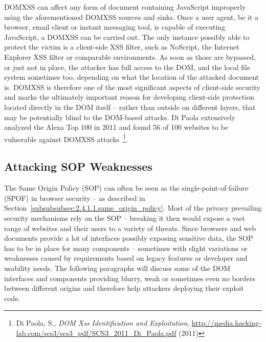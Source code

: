     DOMXSS can affect any form of document containing JavaScript improperly using the aforementioned DOMXSS sources and sinks. Once a user agent, be it a browser, email client or instant messaging tool, is capable of executing JavaScript, a DOMXSS can be carried out. The only instance possibly able to protect the victim is a client-side XSS filter, such as NoScript, the Internet Explorer XSS filter or comparable environments. As soon as those are bypassed, or just not in place, the attacker has full access to the DOM, and the local file system sometimes too, depending on what the location of the attacked document is. DOMXSS is therefore one of the most significant aspects of client-side security and marks the ultimately important reason for developing client-side protection located directly in the DOM itself -- rather than outside on different layers, that may be potentially blind to the DOM-based attacks. Di Paola extensively analyzed the Alexa Top 100 in 2011 and found 56 of 100 websites to be vulnerable 
against DOMXSS attacks~\footnote{Di Paola, S., \textit{DOM Xss Identification and
Exploitation}, \url{http://media.hacking-lab.com/scs3/scs3_pdf/SCS3_2011_Di_Paola.pdf} (2011)}.

    \subsection{Attacking SOP Weaknesses}
    \label{subsubsec:5.4.5.attacking_sop_weaknesses}

    The Same Origin Policy (SOP) can often be seen as the single-point-of-failure (SPOF) in browser security -- as described in Section~\ref{subsubsubsec:2.4.1.1.same_origin_policy}. Most of the privacy prevailing security mechanisms rely on the SOP -- breaking it then would expose a vast range of websites and their users to a variety of threats. Since browsers and web documents provide a lot of interfaces possibly exposing sensitive data, the SOP has to be in place for many components -- sometimes with slight variations or weaknesses caused by requirements based on legacy features or developer and usability needs. The following paragraphs will discuss some of the DOM interfaces and components providing blurry, weak or sometimes even no borders between different origins and therefore help attackers deploying their exploit code.\\

